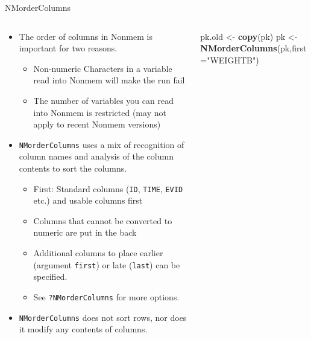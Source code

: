 \documentclass[
  8pt,
  ignorenonframetext,
  aspectratio=169]{beamer}
\newenvironment{Shaded}{\begin{snugshade}}{\end{snugshade}}
\newcommand{\DataTypeTok}[1]{\textcolor[rgb]{0.13,0.29,0.53}{#1}}
\newcommand{\KeywordTok}[1]{\textcolor[rgb]{0.13,0.29,0.53}{\textbf{#1}}}
\newcommand{\NormalTok}[1]{#1}
\newcommand{\StringTok}[1]{\textcolor[rgb]{0.31,0.60,0.02}{#1}}
\providecommand{\tightlist}{%
  \setlength{\itemsep}{0pt}\setlength{\parskip}{0pt}}
\begin{document}
\begin{frame}[fragile]{NMorderColumns}
\protect\hypertarget{nmordercolumns}{}
\begin{columns}[T]
\begin{column}{0.48\textwidth}
\vspace{12pt}

\begin{itemize}
\item
  The order of columns in Nonmem is important for two reasons.

  \begin{itemize}
  \tightlist
  \item
    Non-numeric Characters in a variable read into Nonmem will make the
    run fail
  \item
    The number of variables you can read into Nonmem is restricted (may
    not apply to recent Nonmem versions)
  \end{itemize}
\item
  \texttt{NMorderColumns} uses a mix of recognition of column names and
  analysis of the column contents to sort the columns.

  \begin{itemize}
  \item
    First: Standard columns (\texttt{ID}, \texttt{TIME}, \texttt{EVID}
    etc.) and usable columns first
  \item
    Columns that cannot be converted to numeric are put in the back
  \item
    Additional columns to place earlier (argument \texttt{first}) or
    late (\texttt{last}) can be specified.
  \item
    See \texttt{?NMorderColumns} for more options.
  \end{itemize}
\item
  \texttt{NMorderColumns} does not sort rows, nor does it modify any
  contents of columns.
\end{itemize}
\end{column}

\begin{column}{0.48\textwidth}
\footnotesize

\begin{Shaded}
\begin{Highlighting}[]
\NormalTok{pk.old \textless{}{-}}\StringTok{ }\KeywordTok{copy}\NormalTok{(pk)}
\NormalTok{pk \textless{}{-}}\StringTok{ }\KeywordTok{NMorderColumns}\NormalTok{(pk,}\DataTypeTok{first=}\StringTok{"WEIGHTB"}\NormalTok{)}
\end{Highlighting}
\end{Shaded}


\end{column}
\end{columns}
\end{frame}
\end{document}
